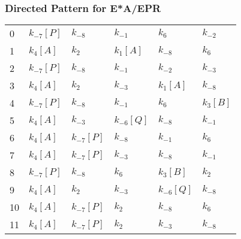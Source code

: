 \documentclass{article}%
\begin{document}
\subsubsection{Directed Pattern for E*A/EPR}%
\label{ssubsec:Directed Pattern for E*A/EPR}%
\begin{tabular}{llllll}
\toprule
0  &  $k_{-7}$$[P]$ &       $k_{-8}$ &       $k_{-1}$ &        $k_{6}$ &      $k_{-2}$ \\
1  &   $k_{4}$$[A]$ &        $k_{2}$ &   $k_{1}$$[A]$ &       $k_{-8}$ &       $k_{6}$ \\
2  &  $k_{-7}$$[P]$ &       $k_{-8}$ &       $k_{-1}$ &       $k_{-2}$ &      $k_{-3}$ \\
3  &   $k_{4}$$[A]$ &        $k_{2}$ &       $k_{-3}$ &   $k_{1}$$[A]$ &      $k_{-8}$ \\
4  &  $k_{-7}$$[P]$ &       $k_{-8}$ &       $k_{-1}$ &        $k_{6}$ &  $k_{3}$$[B]$ \\
5  &   $k_{4}$$[A]$ &       $k_{-3}$ &  $k_{-6}$$[Q]$ &       $k_{-8}$ &      $k_{-1}$ \\
6  &   $k_{4}$$[A]$ &  $k_{-7}$$[P]$ &       $k_{-8}$ &       $k_{-1}$ &       $k_{6}$ \\
7  &   $k_{4}$$[A]$ &  $k_{-7}$$[P]$ &       $k_{-3}$ &       $k_{-8}$ &      $k_{-1}$ \\
8  &  $k_{-7}$$[P]$ &       $k_{-8}$ &        $k_{6}$ &   $k_{3}$$[B]$ &       $k_{2}$ \\
9  &   $k_{4}$$[A]$ &        $k_{2}$ &       $k_{-3}$ &  $k_{-6}$$[Q]$ &      $k_{-8}$ \\
10 &   $k_{4}$$[A]$ &  $k_{-7}$$[P]$ &        $k_{2}$ &       $k_{-8}$ &       $k_{6}$ \\
11 &   $k_{4}$$[A]$ &  $k_{-7}$$[P]$ &        $k_{2}$ &       $k_{-3}$ &      $k_{-8}$ \\
\bottomrule
\end{tabular}

%
\end{document}
